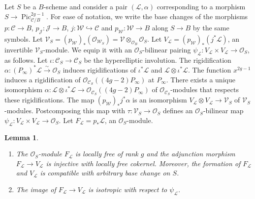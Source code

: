 \documentclass{article} %
\newtheorem{lemma}[proposition]{Lemma}
\numberwithin{equation}{section}
\DeclareMathOperator{\Pic}{Pic}
\newcommand{\sh}[1]{\mathscr{#1}}
\renewcommand{\O}{\mathcal{O}}
\begin{document}
Let $S$ be a $B$-scheme and consider a pair $(\sh{L}, \alpha)$ corresponding to a morphism $S\rightarrow \Pic^{2g-1}_{\mathcal{C}/B}$. 
For ease of notation, we write the base changes of the morphisms $p\colon \mathcal{C}\rightarrow B$, $p_{\mathcal{J}}\colon \mathcal{J} \rightarrow B$, $j\colon \mathcal{W}\hookrightarrow \mathcal{C}$ and $p_{\mathcal{W}} \colon \mathcal{W} \rightarrow B$ along $S\rightarrow B$ by the same symbols.
Let $\sh{V}_S = (p_{\mathcal{W}})_*(\O_{\mathcal{W}_S}) = \sh{V} \otimes_{\O_B}\O_S$.
Let $V_{\sh{L}} = (p_{\mathcal{W}})_*(j^*\sh{L})$, an invertible $\sh{V}_S$-module.
We equip it with an $\O_S$-bilinear pairing $\psi_{\sh{L}}\colon V_{\sh{L}} \times V_{\sh{L}} \rightarrow \O_S$, as follows.
Let $\iota\colon \mathcal{C}_S\rightarrow \mathcal{C}_S$ be the hyperelliptic involution. 
The rigidification $\alpha\colon (P_{\infty})^* \sh{L}\xrightarrow{\sim} \O_S$ induces rigidifications of $\iota^*\sh{L}$ and $\sh{L}\otimes \iota^*\sh{L}$.
The function $x^{2g-1}$ induces a rigidification of $\O_{\mathcal{C}_S}((4g-2)P_{\infty})$ at $P_{\infty}$.
There exists a unique isomorphism  $\alpha\colon \sh{L}\otimes \iota^*\sh{L}\rightarrow \O_{\mathcal{C}_S}((4g-2)P_{\infty})$ of $\O_{\mathcal{C}_S}$-modules that respects these rigidifications.
The map $(p_{\mathcal{W}})_*j^*\alpha$ is an isomorphism $V_{\sh{L}}\otimes V_{\sh{L}} \rightarrow  \sh{V}_S$ of $\sh{V}_S$-modules.
Postcomposing this map with $\tau\colon \sh{V}_S\rightarrow \O_S$ defines an $\O_S$-bilinear map $\psi_{\sh{L}}\colon V_{\sh{L}} \times V_{\sh{L}} \rightarrow \O_S$.
Let $F_{\sh{L}} = p_* \sh{L}$, an $\O_S$-module.
\begin{lemma}\label{lemma_constructionFLandVL_relativeversion}
    \begin{enumerate}
        \item The $\O_S$-module $F_{\sh{L}}$ is locally free of rank $g$ and the adjunction morphism $F_{\sh{L}} \rightarrow V_{\sh{L}}$ is injective with locally free cokernel. Moreover, the formation of $F_{\sh{L}}$ and $V_{\sh{L}}$ is compatible with arbitrary base change on $S$.
        \item The image of $F_{\sh{L}}\rightarrow V_{\sh{L}}$ is isotropic with respect to $\psi_{\sh{L}}$.
    \end{enumerate}
\end{lemma}
\end{document}

